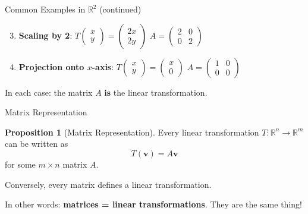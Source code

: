 \documentclass[10pt]{beamer}
\theoremstyle{definition}
\newtheorem{prop}{Proposition}[section]
\newcommand{\x}[1]{\alert{\textbf{#1}}}
\begin{document}
\begin{frame}{Common Examples in $\mathbb{R}^2$ (continued)}

\begin{enumerate}
\setcounter{enumi}{2}

\item \x{Scaling by 2}:
$T\begin{pmatrix} x \\ y \end{pmatrix} = \begin{pmatrix} 2x \\ 2y \end{pmatrix}$
\quad $A = \begin{pmatrix} 2 & 0 \\ 0 & 2 \end{pmatrix}$

\vspace{1em}

\item \x{Projection onto $x$-axis}:
$T\begin{pmatrix} x \\ y \end{pmatrix} = \begin{pmatrix} x \\ 0 \end{pmatrix}$
\quad $A = \begin{pmatrix} 1 & 0 \\ 0 & 0 \end{pmatrix}$
\end{enumerate}

\vspace{1em}

In each case: the matrix $A$ \x{is} the linear transformation.

\end{frame}

\begin{frame}{Matrix Representation}

\begin{prop}[Matrix Representation]
Every linear transformation $T: \mathbb{R}^n \to \mathbb{R}^m$ can be written as
$$T(\mathbf{v}) = A\mathbf{v}$$
for some $m \times n$ matrix $A$.

Conversely, every matrix defines a linear transformation.
\end{prop}

\vspace{1em}

In other words: \x{matrices = linear transformations}. They are the same thing!

\end{frame}
\end{document}

